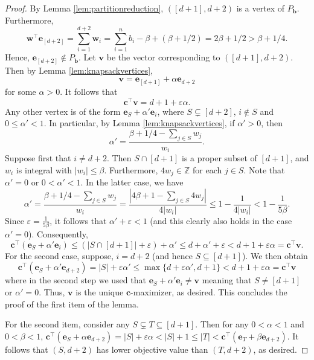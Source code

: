 \documentclass[centering,11pt,reqno]{amsart}
\theoremstyle{definition}
\begin{document}
\begin{proof}
By Lemma \ref{lem:partitionreduction}, $([d+1], d+2)$ is a vertex of $P_{\mathbf{b}}$. Furthermore, \[\mathbf{w}^{\intercal} \mathbf{e}_{[d+2]} = \sum_{i=1}^{d+2} \mathbf{w}_{i} = \sum_{i=1}^{n} b_{i} -\beta + (\beta +1/2) = 2\beta + 1/2 > \beta + 1/4.\]
Hence, $\mathbf{e}_{[d+2]} \notin P_{\mathbf{b}}$. Let $\mathbf{v}$ be the vector corresponding to $([d+1], d+2)$. Then by Lemma \ref{lem:knapsackvertices},
\[\mathbf{v} = \mathbf{e}_{[d+1]} + \alpha \mathbf{e}_{d+2}\]
 for some $\alpha > 0$. It follows that 
\[\mathbf{c}^{\intercal}\mathbf{v} = d+1 + \varepsilon\alpha. \]
Any other vertex is of the form $\mathbf{e}_{S} + \alpha' \mathbf{e}_{i}$, where $S\subsetneq [d+2]$, $i\notin S$ and $0 \leq \alpha' < 1$. In particular, by Lemma \ref{lem:knapsackvertices}, if $\alpha' > 0$, then
\[\alpha' = \frac{\beta + 1/4 - \sum_{j \in S} w_{j}}{w_{i}}.\]
Suppose first that $i \neq d+2$. Then $S\cap [d+1]$ is a proper subset of $[d+1]$, and $w_{i}$ is integral with $|w_{i}| \leq \beta$. Furthermore, $4w_{j} \in \mathbb{Z}$ for each $j \in S$. Note that $\alpha'=0$ or $0<\alpha'<1$. In the latter case, we have
\[\alpha' =\frac{\beta + 1/4 - \sum_{j \in S} w_{j}}{w_{i}}=\frac{\left|4\beta + 1 - \sum_{j \in S} 4w_{j}\right|}{4\left|w_{i}\right|} \leq 1 - \frac{1}{4|w_i|} < 1 - \frac{1}{5 \beta}.\]
Since $\varepsilon = \frac{1}{5\beta}$, it follows that $\alpha' + \varepsilon < 1$ (and this clearly also holds in the case $\alpha'=0$). Consequently,
\[\mathbf{c}^{\intercal}(\mathbf{e}_{S} + \alpha' \mathbf{e}_{i}) \le (|S \cap [d+1]|+\varepsilon) + \alpha' \le d + \alpha'+\varepsilon<d+1+\varepsilon\alpha= \mathbf{c}^{\intercal}\mathbf{v}.\] 
For the second case, suppose, $i = d+2$ (and hence $S\subseteq [d+1]$). We then obtain
\[\mathbf{c}^{\intercal}(\mathbf{e}_{S} + \alpha' \mathbf{e}_{d+2}) = |S| + \varepsilon\alpha' \leq  \max\{d + \varepsilon\alpha',d+1\}<d+1+\varepsilon\alpha = \mathbf{c}^{\intercal}\mathbf{v} \] where in the second step we used that $\mathbf{e}_S+\alpha'\mathbf{e}_i\neq \mathbf{v}$
meaning that $S \neq [d+1]$ or $\alpha'=0$. Thus, $\mathbf{v}$ is the unique $\mathbf{c}$-maximizer, as desired. This concludes the proof of the first item of the lemma.

For the second item, consider any $S \subsetneq T \subseteq [d+1]$. Then for any $0  < \alpha < 1$ and $0 < \beta < 1$, $\mathbf{c}^{\intercal}(\mathbf{e}_{S} + \alpha \mathbf{e}_{d+2})= |S| + \varepsilon\alpha < |S|+1 \leq |T| < \mathbf{c}^{\intercal}(\mathbf{e}_{T} + \beta \mathbf{e}_{d+2})$. It follows that $(S,d+2)$ has lower objective value than $(T,d+2)$, as desired.
\end{proof}
\end{document}
